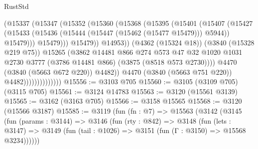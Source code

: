 \begin{lexlean}{RustStd}
\begin{coremodule}
                                      (@15337
                                        (@15347
                                          (@15352
                                            (@15360
                                              (@15368
                                                (@15395
                                                  (@15401
                                                    (@15407
                                                      (@15427
                                                        (@15433
                                                          (@15436
                                                            (@15444
                                                              (@15447 (@15462 (@15477 @15479)))
                                                              @5944))
                                                          @15479)))
                                                    @15479)))
                                              @15479))
                                          @14953))
                                      (@4362 (@15324 @18))
                                      (@3840 (@15328 @219 @75))
                                      @15265
                                      (@3862
                                        @14481
                                        @866
                                        @274
                                        @573
                                        @47
                                        @32
                                        @1020
                                        @1031
                                        @2730
                                        @3777
                                        (@3786 @14481 @866)
                                        (@3875 (@8518 @573 @2730))))
                                    @4470
                                    (@3840 (@5663 @672 @220))
                                    @4482))
                                @4470
                                (@3840 (@5663 @751 @220))
                                @4482))))))))))))))
@15556 := @3103 @705
@15560 := @3105 (@3109 @705) (@3115 @705)
@15561 := @3124 @14783
@15563 := @3120 (@15561 @3139)
@15565 := @3162 (@3163 @705)
@15566 := @3158 @15565
@15568 := @3120 (@15566 @3187)
@15585 := @3119
    (fun (fn : @7) =>
    @15563
      (@3142
        (@3145
          (fun (params : @3144) =>
          @3146
            (fun (rty : @842) =>
            @3148
              (fun (lets : @3147) =>
              @3149 (fun (tail : @1026) => @3151 (fun (Γ : @3150) => @15568 @3234))))))

\end{coremodule}
\end{lexlean}
